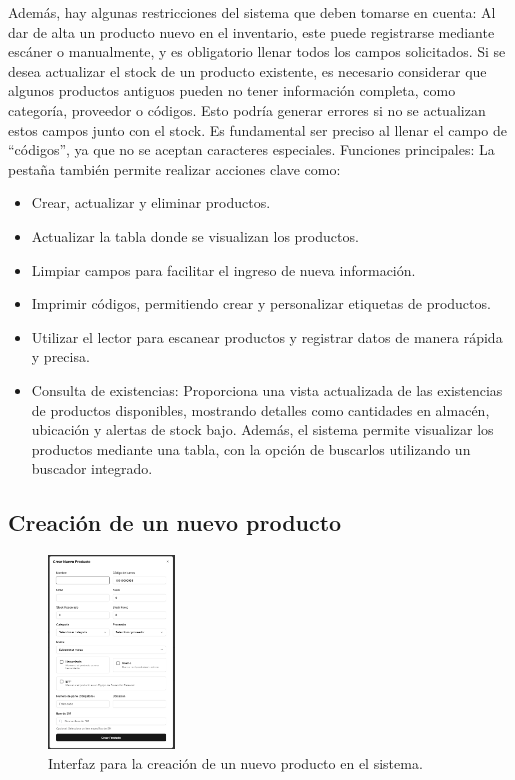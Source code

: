 \begin{justify}
Además, hay algunas restricciones del sistema que deben tomarse en cuenta: 
Al dar de alta un producto nuevo en el inventario, este puede registrarse mediante escáner o manualmente, y es obligatorio llenar todos los campos solicitados. Si se desea actualizar el stock de un producto existente, es necesario considerar que algunos productos antiguos pueden no tener información completa, como categoría, proveedor o códigos. Esto podría generar errores si no se actualizan estos campos junto con el stock. 
Es fundamental ser preciso al llenar el campo de “códigos”, ya que no se aceptan caracteres especiales. Funciones principales: La pestaña también permite realizar acciones clave como: 
\end{justify}
\begin{itemize}
    \item Crear, actualizar y eliminar productos. 

    \item Actualizar la tabla donde se visualizan los productos. 

    \item Limpiar campos para facilitar el ingreso de nueva información. 

    \item Imprimir códigos, permitiendo crear y personalizar etiquetas de productos. 

    \item Utilizar el lector para escanear productos y registrar datos de manera rápida y precisa. 

    \item Consulta de existencias: Proporciona una vista actualizada de las existencias de productos disponibles, mostrando detalles como cantidades en almacén, ubicación y alertas de stock bajo. Además, el sistema permite visualizar los productos mediante una tabla, con la opción de buscarlos utilizando un buscador integrado. 
\end{itemize}

\subsection{Creación de un nuevo producto}

\begin{figure}[ht!]
\centering
\includegraphics[width=0.3\textwidth]{imgs/Almacen_General/inventario/inventario_crear.png}
\caption{Interfaz para la creación de un nuevo producto en el sistema.}
\label{fig:crearProducto}
\end{figure}

